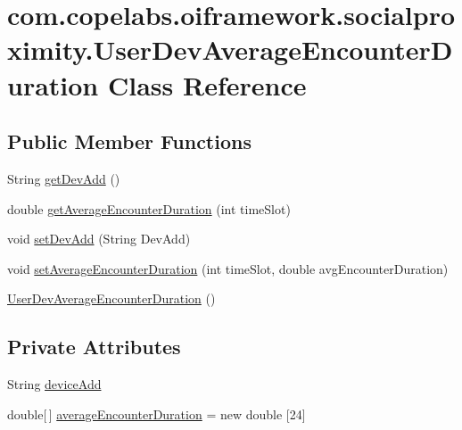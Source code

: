 \hypertarget{classcom_1_1copelabs_1_1oiframework_1_1socialproximity_1_1_user_dev_average_encounter_duration}{}\section{com.\+copelabs.\+oiframework.\+socialproximity.\+User\+Dev\+Average\+Encounter\+Duration Class Reference}
\label{classcom_1_1copelabs_1_1oiframework_1_1socialproximity_1_1_user_dev_average_encounter_duration}
\subsection*{Public Member Functions}
\begin{DoxyCompactItemize}
\item 
String \hyperlink{classcom_1_1copelabs_1_1oiframework_1_1socialproximity_1_1_user_dev_average_encounter_duration_abaeae8fa91b00be049485c5635f8a476}{get\+Dev\+Add} ()
\item 
double \hyperlink{classcom_1_1copelabs_1_1oiframework_1_1socialproximity_1_1_user_dev_average_encounter_duration_a9f61cce9f517161bfc295b82ccb1b4b0}{get\+Average\+Encounter\+Duration} (int time\+Slot)
\item 
void \hyperlink{classcom_1_1copelabs_1_1oiframework_1_1socialproximity_1_1_user_dev_average_encounter_duration_a782ed474256cd426d8d5c17bc06d02ff}{set\+Dev\+Add} (String Dev\+Add)
\item 
void \hyperlink{classcom_1_1copelabs_1_1oiframework_1_1socialproximity_1_1_user_dev_average_encounter_duration_acc62186a773feb5d4a99dd639d14dd23}{set\+Average\+Encounter\+Duration} (int time\+Slot, double avg\+Encounter\+Duration)
\item 
\hyperlink{classcom_1_1copelabs_1_1oiframework_1_1socialproximity_1_1_user_dev_average_encounter_duration_ae2a7de496feb90dc8293be30a3ba5835}{User\+Dev\+Average\+Encounter\+Duration} ()
\end{DoxyCompactItemize}
\subsection*{Private Attributes}
\begin{DoxyCompactItemize}
\item 
String \hyperlink{classcom_1_1copelabs_1_1oiframework_1_1socialproximity_1_1_user_dev_average_encounter_duration_a583f42fad660e870f57d79cf2271032e}{device\+Add}
\item 
double\mbox{[}$\,$\mbox{]} \hyperlink{classcom_1_1copelabs_1_1oiframework_1_1socialproximity_1_1_user_dev_average_encounter_duration_a6b7d9c697cc33d33e715f0080eba888d}{average\+Encounter\+Duration} = new double \mbox{[}24\mbox{]}
\end{DoxyCompactItemize}


